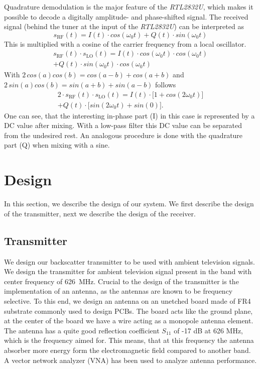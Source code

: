\documentclass[conference]{IEEEtran}
\begin{document}
Quadrature demodulation is the major feature of the \textit{RTL2832U},  which makes it possible to decode a digitally amplitude- and phase-shifted signal. The received signal (behind the tuner at the input of the \textit{RTL2832U}) can be interpreted as
\begin{equation}
	s_{\text{RF}}(t)=I(t) \cdot cos(\omega_{0}t) + Q(t) \cdot sin(\omega_{0}t)
\end{equation}     
This is multiplied with a cosine of the carrier frequency from a local oscillator.
\begin{multline}
        s_{\text{RF}}(t) \cdot s_{\text{LO}}(t) = I(t) \cdot cos(\omega_{0}t) \cdot cos(\omega_{0}t)\\+ Q(t) \cdot sin(\omega_{0}t) \cdot cos(\omega_{0}t)
\end{multline}
With \ensuremath{2\,cos(a)cos(b)=cos(a-b)+cos(a+b)} and \ensuremath{2\,sin(a)cos(b)=sin(a+b)+sin(a-b)} follows
\begin{multline}
        2 \cdot s_{\text{RF}}(t) \cdot s_{\text{LO}}(t) = I(t) \cdot \bigl[1+cos(2\omega_{0}t)\bigr]\\+ Q(t) \cdot \bigl[sin(2\omega_0t)+sin(0)\bigr].
\end{multline}
One can see, that the interesting in-phase part (I) in this case is
represented by a DC value after mixing. With a low-pass filter this DC
value can be separated from the undesired rest. An analogous procedure
is done with the quadrature part (Q) when mixing with a sine.

\section{Design}
In this section, we describe the design 
of our system. We first describe the
design of the transmitter, next we describe 
the design of the receiver.

\subsection{Transmitter}
 
We design our backscatter transmitter to be used with ambient
television signals.  We design the transmitter for ambient
television signal present in the band with  
center frequency of \SI{626}{\mega\hertz}. Crucial to the design
of the transmitter is the implementation of an antenna, as
the antennas are known to be  frequency selective. To this end, we design an
antenna on an unetched board made of FR4 substrate commonly
used to design PCBs. The board acts like the ground plane, at the center
of the board we have a wire acting as a monopole antenna element. 
The antenna has a quite good reflection coefficient \ensuremath{S_{11}} 
of -17 dB at 626 MHz, which is the frequency aimed for. This means, that at 
this frequency the antenna absorber more energy form the electromagnetic field compared to another band. A vector network analyzer (VNA) has been used to analyze antenna performance.
\end{document}
